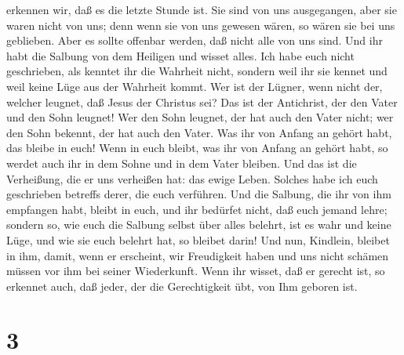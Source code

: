 erkennen wir, daß es die letzte Stunde ist.  Sie sind von
uns ausgegangen, aber sie waren nicht von uns; denn wenn sie von uns
gewesen wären, so wären sie bei uns geblieben. Aber es sollte offenbar
werden, daß nicht alle von uns sind.  Und ihr habt die
Salbung von dem Heiligen und wisset alles.  Ich habe euch
nicht geschrieben, als kenntet ihr die Wahrheit nicht, sondern weil ihr
sie kennet und weil keine Lüge aus der Wahrheit kommt. 
Wer ist der Lügner, wenn nicht der, welcher leugnet, daß Jesus der
Christus sei? Das ist der Antichrist, der den Vater und den Sohn
leugnet!  Wer den Sohn leugnet, der hat auch den Vater
nicht; wer den Sohn bekennt, der hat auch den Vater.  Was
ihr von Anfang an gehört habt, das bleibe in euch! Wenn in euch bleibt,
was ihr von Anfang an gehört habt, so werdet auch ihr in dem Sohne und
in dem Vater bleiben.  Und das ist die Verheißung, die er
uns verheißen hat: das ewige Leben.  Solches habe ich
euch geschrieben betreffs derer, die euch verführen.  Und
die Salbung, die ihr von ihm empfangen habt, bleibt in euch, und ihr
bedürfet nicht, daß euch jemand lehre; sondern so, wie euch die Salbung
selbst über alles belehrt, ist es wahr und keine Lüge, und wie sie euch
belehrt hat, so bleibet darin!  Und nun, Kindlein,
bleibet in ihm, damit, wenn er erscheint, wir Freudigkeit haben und uns
nicht schämen müssen vor ihm bei seiner Wiederkunft. 
Wenn ihr wisset, daß er gerecht ist, so erkennet auch, daß jeder, der
die Gerechtigkeit übt, von Ihm geboren ist.

\hypertarget{section-2}{%
\section{3}\label{section-2}}


